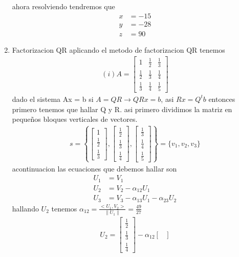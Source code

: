 \begin{enumerate}
ahora resolviendo tendremos que 
\begin{align*}
x &=-15\\
y &=-28\\
z &= 90 
\end{align*}
\item Factorizacion QR
aplicando el metodo de factorizacion QR tenemos
\begin{align*}
	(i) A =
\begin{bmatrix}
1 &\frac{1}{2} &\frac{1}{3} \\[6pt]
\frac{1}{2} &\frac{1}{3} &\frac{1}{4} \\[6pt]
\frac{1}{3} &\frac{1}{4} &\frac{1}{5} 
\end{bmatrix}
\end{align*}
dado el sistema Ax = b si $A= QR \rightarrow QRx = b$, asi $Rx = Q^t b$
entonces primero tenemos que hallar Q y R.
asi primero dividimos la matriz en pequeños bloques verticales de vectores.
\begin{align*}
s=
\left\lbrace 
\begin{bmatrix}
1\\[6pt]
\frac{1}{2}\\[6pt]
\frac{1}{3}
\end{bmatrix}
,
\begin{bmatrix}
\frac{1}{2}\\[6pt]
\frac{1}{3}\\[6pt]
\frac{1}{4}
\end{bmatrix}
,
\begin{bmatrix}
\frac{1}{3}\\[6pt]
\frac{1}{4}\\[6pt]
\frac{1}{5}
\end{bmatrix}
\right\rbrace
=\{ v_1, v_2, v_3\}
\end{align*}
acontinuacion las ecuaciones que debemos hallar son
\begin{align*}
U_1 &= V_1\\
U_2 &= V_2 - \alpha_{12}U_1\\
U_3 &= V_3 -\alpha_{13}U_1-\alpha_{23}U_2
\end{align*}
hallando $U_2$ tenemos $\alpha_{12}=\frac{<U_1,V_2>}{\parallel U_1\parallel} = \frac{49}{27}$
\begin{align*}
U_2 =
\begin{bmatrix}
\frac{1}{2}\\[6pt]
\frac{1}{3}\\[6pt]
\frac{1}{4}
\end{bmatrix}
- \alpha_{12}
\begin{bmatrix}

\end{bmatrix}
\end{align*}
\end{enumerate}
